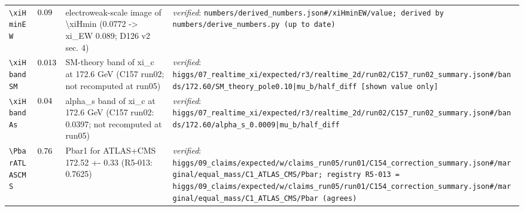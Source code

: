 {\begin{longtable}{@{}>{\raggedright\arraybackslash}p{}>{\raggedright\arraybackslash}p{}>{\raggedright\arraybackslash}p{}>{\raggedright\arraybackslash}p{}@{}}
\texttt{\textbackslash xiHminEW} & $0.09$ & electroweak-scale image of \textbackslash{}xiHmin (0.0772 -\textgreater{} xi\_\allowbreak{}EW 0.089; D126 v2 sec. 4) & \emph{verified}: \texttt{numbers/\allowbreak{}derived\_\allowbreak{}numbers.json\#/\allowbreak{}xiHminEW/\allowbreak{}value; derived by numbers/\allowbreak{}derive\_\allowbreak{}numbers.py (up to date)} \\
\texttt{\textbackslash xiHbandSM} & $0.013$ & SM-theory band of xi\_\allowbreak{}c at 172.6 GeV (C157 run02; not recomputed at run05) & \emph{verified}: \texttt{higgs/\allowbreak{}07\_\allowbreak{}realtime\_\allowbreak{}xi/\allowbreak{}expected/\allowbreak{}r3/\allowbreak{}realtime\_\allowbreak{}2d/\allowbreak{}run02/\allowbreak{}C157\_\allowbreak{}run02\_\allowbreak{}summary.json\#/\allowbreak{}bands/\allowbreak{}172.60/\allowbreak{}SM\_\allowbreak{}theory\_\allowbreak{}pole0.10|\allowbreak{}mu\_\allowbreak{}b/\allowbreak{}half\_\allowbreak{}diff [shown value only]} \\
\texttt{\textbackslash xiHbandAs} & $0.04$ & alpha\_\allowbreak{}s band of xi\_\allowbreak{}c at 172.6 GeV (C157 run02: 0.0397; not recomputed at run05) & \emph{verified}: \texttt{higgs/\allowbreak{}07\_\allowbreak{}realtime\_\allowbreak{}xi/\allowbreak{}expected/\allowbreak{}r3/\allowbreak{}realtime\_\allowbreak{}2d/\allowbreak{}run02/\allowbreak{}C157\_\allowbreak{}run02\_\allowbreak{}summary.json\#/\allowbreak{}bands/\allowbreak{}172.60/\allowbreak{}alpha\_\allowbreak{}s\_\allowbreak{}0.0009|\allowbreak{}mu\_\allowbreak{}b/\allowbreak{}half\_\allowbreak{}diff} \\
\texttt{\textbackslash PbarATLASCMS} & $0.76$ & Pbar1 for ATLAS+CMS 172.52 +- 0.33 (R5-013: 0.7625) & \emph{verified}: \texttt{higgs/\allowbreak{}09\_\allowbreak{}claims/\allowbreak{}expected/\allowbreak{}w/\allowbreak{}claims\_\allowbreak{}run05/\allowbreak{}run01/\allowbreak{}C154\_\allowbreak{}correction\_\allowbreak{}summary.json\#/\allowbreak{}marginal/\allowbreak{}equal\_\allowbreak{}mass/\allowbreak{}C1\_\allowbreak{}ATLAS\_\allowbreak{}CMS/\allowbreak{}Pbar; registry R5-013 = higgs/\allowbreak{}09\_\allowbreak{}claims/\allowbreak{}expected/\allowbreak{}w/\allowbreak{}claims\_\allowbreak{}run05/\allowbreak{}run01/\allowbreak{}C154\_\allowbreak{}correction\_\allowbreak{}summary.json\#/\allowbreak{}marginal/\allowbreak{}equal\_\allowbreak{}mass/\allowbreak{}C1\_\allowbreak{}ATLAS\_\allowbreak{}CMS/\allowbreak{}Pbar (agrees)} \\

\end{longtable}}
